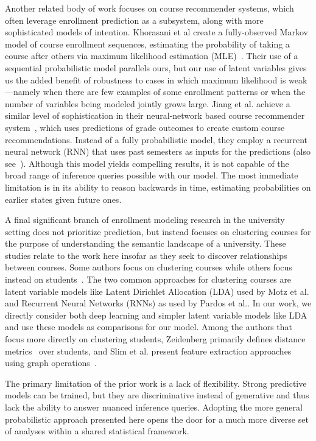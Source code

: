 \documentclass{edm_template}
\begin{document}
Another related body of work focuses on course recommender systems, which often leverage enrollment prediction as a subsystem, along with more sophisticated models of intention. Khorasani et al create a fully-observed Markov model of course enrollment sequences, estimating the probability of taking a course after others via maximum likelihood estimation (MLE)~\cite{Khorasani2016AMC}. Their use of a sequential probabilistic model parallels ours, but our use of latent variables gives us the added benefit of robustness to cases in which maximum likelihood is weak---namely when there are few examples of some enrollment patterns or when the number of variables being modeled jointly grows large. Jiang et al. achieve a similar level of sophistication in their neural-network based course recommender system~\cite{Jiang2018GoalbasedCR}, which uses predictions of grade outcomes to create custom course recommendations. Instead of a fully probabilistic model, they employ a recurrent neural network (RNN) that uses past semesters as inputs for the predictions (also see~\cite{pardos2018connectionist}). Although this model yields compelling results, it is not capable of the broad range of inference queries possible with our model. The most immediate limitation is in its ability to reason backwards in time, estimating probabilities on earlier states given future ones. 

A final significant branch of enrollment modeling research in the university setting does not prioritize prediction, but instead focuses on clustering courses for the purpose of understanding the semantic landscape of a university. These studies relate to the work here insofar as they seek to discover relationships between courses. Some authors focus on clustering courses \cite{Motz2018FindingTI}\cite{Pardos2018AMO} while others focus instead on students~\cite{Zeidenberg2011TheCO}\cite{Slim2016TheIO}. The two common approaches for clustering courses are latent variable models like Latent Dirichlet Allocation (LDA) used by Motz et al. and Recurrent Neural Networks (RNNs) as used by Pardos et al.. In our work, we directly consider both deep learning and simpler latent variable models like LDA and use these models as comparisons for our model. Among the authors that focus more directly on clustering students, Zeidenberg primarily defines distance metrics~\cite{Zeidenberg2011TheCO} over students, and Slim et al. present feature extraction approaches using graph operations~\cite{Slim2016TheIO}. 

The primary limitation of the prior work is a lack of flexibility. Strong predictive models can be trained, but they are discriminative instead of generative and thus lack the ability to answer nuanced inference queries. Adopting the more general probabilistic approach presented here opens the door for a much more diverse set of analyses within a shared statistical framework.
\end{document}
